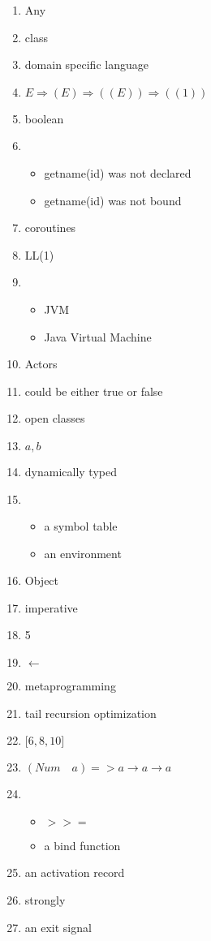 \documentclass{exam}
\begin{document}
\begin{enumerate}
\item Any
\item class
\item domain specific language
\item $E \Rightarrow (E) \Rightarrow ((E)) \Rightarrow ((1))$
\item boolean
\item \begin{itemize}
\item getname(id) was not declared
\item getname(id) was not bound
\end{itemize}
\item coroutines
\item LL(1)
\item \begin{itemize}
\item JVM
\item Java Virtual Machine
\end{itemize}
\item Actors
\item could be either true or false
\item open classes
\item ${a,b}$
\item dynamically typed
\item \begin{itemize}
\item a symbol table
\item an environment
\end{itemize}
\item Object
\item imperative
\item 5
\item $\leftarrow$
\item metaprogramming
\item tail recursion optimization
\item $\lbrack 6, 8, 10\rbrack$
\item $(Num \quad a) => a \rightarrow a \rightarrow a$
\item \begin{itemize}
\item $>>=$
\item a bind function
\end{itemize}
\item an activation record
\item strongly
\item an exit signal

\end{enumerate}
\end{document}
